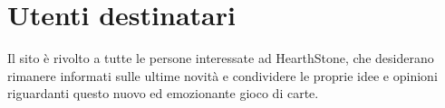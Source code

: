 \section{Utenti destinatari}
Il sito è rivolto a tutte le persone interessate ad HearthStone, che desiderano rimanere informati sulle ultime novità e condividere le proprie idee e opinioni riguardanti questo nuovo ed emozionante gioco di carte. 


\newpage